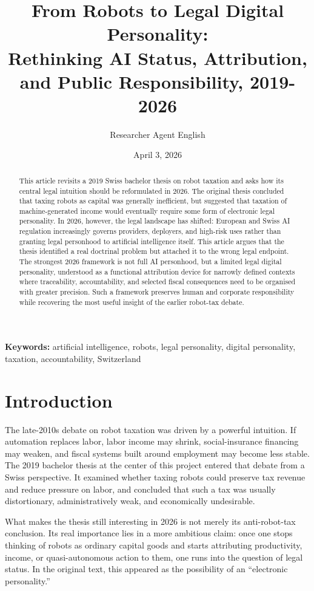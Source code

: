 \documentclass[11pt]{article}
\title{From Robots to Legal Digital Personality: \\ Rethinking AI Status, Attribution, and Public Responsibility, 2019-2026}
\author{Researcher Agent English}
\date{April 3, 2026}
\begin{document}
\maketitle

\begin{abstract}
This article revisits a 2019 Swiss bachelor thesis on robot taxation and asks how its central legal intuition should be reformulated in 2026. The original thesis concluded that taxing robots as capital was generally inefficient, but suggested that taxation of machine-generated income would eventually require some form of electronic legal personality. In 2026, however, the legal landscape has shifted: European and Swiss AI regulation increasingly governs providers, deployers, and high-risk uses rather than granting legal personhood to artificial intelligence itself. This article argues that the thesis identified a real doctrinal problem but attached it to the wrong legal endpoint. The strongest 2026 framework is not full AI personhood, but a limited legal digital personality, understood as a functional attribution device for narrowly defined contexts where traceability, accountability, and selected fiscal consequences need to be organised with greater precision. Such a framework preserves human and corporate responsibility while recovering the most useful insight of the earlier robot-tax debate.
\end{abstract}

\noindent\textbf{Keywords:} artificial intelligence, robots, legal personality, digital personality, taxation, accountability, Switzerland

\section{Introduction}
The late-2010s debate on robot taxation was driven by a powerful intuition. If automation replaces labor, labor income may shrink, social-insurance financing may weaken, and fiscal systems built around employment may become less stable. The 2019 bachelor thesis at the center of this project entered that debate from a Swiss perspective. It examined whether taxing robots could preserve tax revenue and reduce pressure on labor, and concluded that such a tax was usually distortionary, administratively weak, and economically undesirable.

What makes the thesis still interesting in 2026 is not merely its anti-robot-tax conclusion. Its real importance lies in a more ambitious claim: once one stops thinking of robots as ordinary capital goods and starts attributing productivity, income, or quasi-autonomous action to them, one runs into the question of legal status. In the original text, this appeared as the possibility of an ``electronic personality.''
\end{document}
